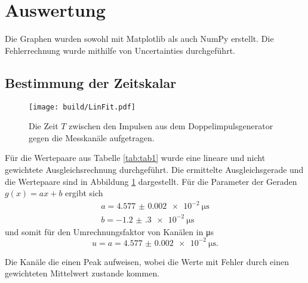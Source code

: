 \section{Auswertung}
\label{sec:Auswertung}


Die Graphen wurden sowohl mit Matplotlib \cite{matplotlib} als auch NumPy \cite{numpy} erstellt. Die
Fehlerrechnung wurde mithilfe von Uncertainties \cite{uncertainties} durchgeführt.


\subsection{Bestimmung der Zeitskalar}
\begin{figure}
	\centering
	\texttt{[image: build/LinFit.pdf]}
	\caption{Die Zeit $T$ zwischen den Impulsen aus dem Doppelimpulsgenerator gegen die Messkanäle aufgetragen.}
	\label{fig:erste}
\end{figure}

Für die Wertepaare aus Tabelle \ref{tab:tab1}  wurde eine lineare und nicht gewichtete Ausgleichsrechnung durchgeführt. Die ermittelte Ausgleichsgerade und die Wertepaare sind in Abbildung \ref{fig:erste} dargestellt. Für die Parameter der Geraden $g(x)=a x + b$ ergibt sich
\begin{gather*}
a=\SI{4.577(2)e-2}{\micro\second}\\
b=\SI{-1.2(3)e-2}{\micro\second}
\end{gather*}
und somit für den Umrechnungsfaktor von Kanälen in \si{\micro\second}
\begin{displaymath}
u=a=\SI{4.577(2)e-2}{\micro\second}.
\end{displaymath}
\begin{table}
	\centering
	\caption{Die Kanäle die einen Peak aufweisen, wobei die Werte mit Fehler durch einen gewichteten Mittelwert zustande kommen.}
	
\end{table}

